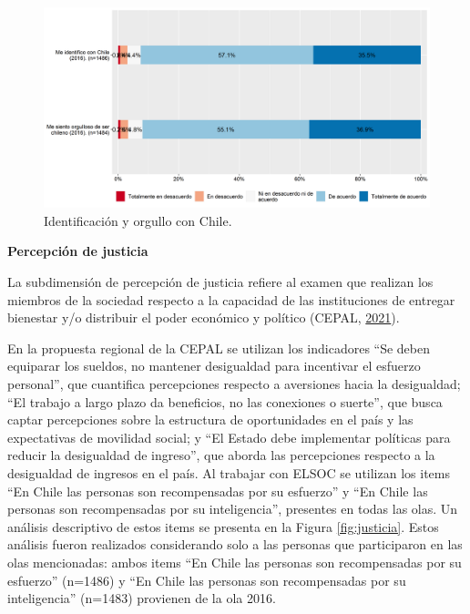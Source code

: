 \documentclass[
  12pt,
]{book}
\begin{document}
\begin{figure}[H]

{\centering \includegraphics[width=1\linewidth,height=1\textheight]{output/graphs/identificacion} 

}

\caption{Identificación y orgullo con Chile.}\label{fig:identificacion}
\end{figure}

\textbf{Percepción de justicia}

La subdimensión de percepción de justicia refiere al examen que realizan los miembros de la sociedad respecto a la capacidad de las instituciones de entregar bienestar y/o distribuir el poder económico y político (CEPAL, \protect\hyperlink{ref-cepal_cohesion_2021}{2021}).

En la propuesta regional de la CEPAL se utilizan los indicadores ``Se deben equiparar los sueldos, no mantener desigualdad para incentivar el esfuerzo personal'', que cuantifica percepciones respecto a aversiones hacia la desigualdad; ``El trabajo a largo plazo da beneficios, no las conexiones o suerte'', que busca captar percepciones sobre la estructura de oportunidades en el país y las expectativas de movilidad social; y ``El Estado debe implementar políticas para reducir la desigualdad de ingreso'', que aborda las percepciones respecto a la desigualdad de ingresos en el país. Al trabajar con ELSOC se utilizan los items ``En Chile las personas son recompensadas por su esfuerzo'' y ``En Chile las personas son recompensadas por su inteligencia'', presentes en todas las olas. Un análisis descriptivo de estos items se presenta en la Figura \ref{fig:justicia}. Estos análisis fueron realizados considerando solo a las personas que participaron en las olas mencionadas: ambos items ``En Chile las personas son recompensadas por su esfuerzo'' (n=1486) y ``En Chile las personas son recompensadas por su inteligencia'' (n=1483) provienen de la ola 2016.
\end{document}
